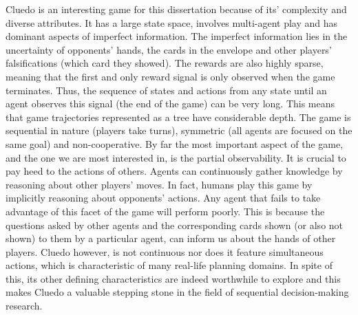 \documentclass[msc, ai, logo, twoside, notimes, parskip, leftchapter, normalheadings]{infthesis}
\begin{document}
Cluedo is an interesting game for this dissertation because of its' complexity and diverse attributes. It has a large state space, involves multi-agent play and has dominant aspects of imperfect information. The imperfect information lies in the uncertainty of opponents' hands, the cards in the envelope and other players' falsifications (which card they showed). The rewards are also highly sparse, meaning that the first and only reward signal is only observed when the game terminates. Thus, the sequence of states and actions from any state until an agent observes this signal (the end of the game) can be very long. This means that game trajectories represented as a tree have considerable depth. The game is sequential in nature (players take turns), symmetric (all agents are focused on the same goal) and non-cooperative. By far the most important aspect of the game, and the one we are most interested in, is the partial observability. It is crucial to pay heed to the actions of others. Agents can continuously gather knowledge by reasoning about other players' moves. In fact, humans play this game by implicitly reasoning about opponents' actions. Any agent that fails to take advantage of this facet of the game will perform poorly. This is because the questions asked by other agents and the corresponding cards shown (or also not shown) to them by a particular agent, can inform us about the hands of other players. Cluedo however, is not continuous nor does it feature simultaneous actions, which is characteristic of many real-life planning domains. In spite of this, its other defining characteristics are indeed worthwhile to explore and this makes Cluedo a valuable stepping stone in the field of sequential decision-making research.
\end{document}
